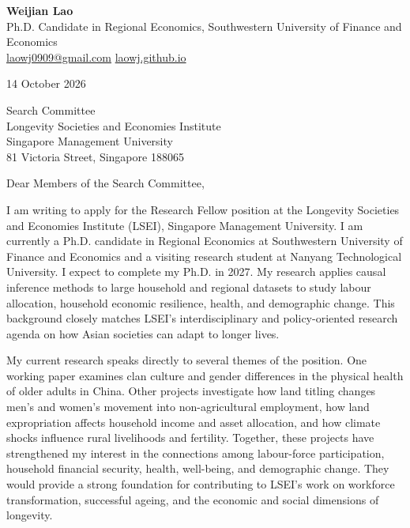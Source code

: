 \documentclass[11pt,a4paper]{article}
\begin{document}
\begin{center}
  {\Large\textbf{Weijian Lao}}\\[0.25em]
  Ph.D. Candidate in Regional Economics, Southwestern University of Finance and Economics\\
  \href{mailto:laowj0909@gmail.com}{laowj0909@gmail.com}
  \quad\textbar\quad
  \href{https://laowj.github.io}{laowj.github.io}
\end{center}

\vspace{0.35em}

14 October 2026

\vspace{0.35em}

Search Committee\\
Longevity Societies and Economies Institute\\
Singapore Management University\\
81 Victoria Street, Singapore 188065

\vspace{0.35em}

Dear Members of the Search Committee,

I am writing to apply for the Research Fellow position at the Longevity Societies and Economies Institute (LSEI), Singapore Management University. I am currently a Ph.D. candidate in Regional Economics at Southwestern University of Finance and Economics and a visiting research student at Nanyang Technological University. I expect to complete my Ph.D. in 2027. My research applies causal inference methods to large household and regional datasets to study labour allocation, household economic resilience, health, and demographic change. This background closely matches LSEI's interdisciplinary and policy-oriented research agenda on how Asian societies can adapt to longer lives.

My current research speaks directly to several themes of the position. One working paper examines clan culture and gender differences in the physical health of older adults in China. Other projects investigate how land titling changes men's and women's movement into non-agricultural employment, how land expropriation affects household income and asset allocation, and how climate shocks influence rural livelihoods and fertility. Together, these projects have strengthened my interest in the connections among labour-force participation, household financial security, health, well-being, and demographic change. They would provide a strong foundation for contributing to LSEI's work on workforce transformation, successful ageing, and the economic and social dimensions of longevity.
\end{document}
